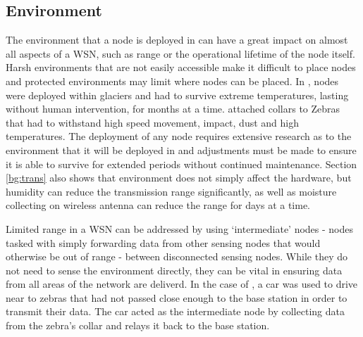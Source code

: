 \subsection{Environment}
	The environment that a node is deployed in can have a great impact on almost all aspects of a WSN, such as range or the operational lifetime of the node itself. Harsh environments that are not easily accessible make it difficult to place nodes and protected environments may limit where nodes can be placed. 
	In \cite{Martinez2004}, nodes were deployed within glaciers and had to survive extreme temperatures, lasting without human intervention, for months at a time. \cite{Martonosi2003} attached collars to Zebras that had to withstand high speed movement, impact, dust and high temperatures. The deployment of any node requires extensive research as to the environment that it will be deployed in and adjustments must be made to ensure it is able to survive for extended periods without continued maintenance.
	Section \ref{bg:trans} also shows that environment does not simply affect the hardware, but humidity can reduce the transmission range significantly, as well as moisture collecting on wireless antenna can reduce the range for days at a time.

	Limited range in a WSN can be addressed by using `intermediate' nodes - nodes tasked with simply forwarding data from other sensing nodes that would otherwise be out of range - between disconnected sensing nodes. While they do not need to sense the environment directly, they can be vital in ensuring data from all areas of the network are deliverd. In the case of \cite{Martonosi2003}, a car was used to drive near to zebras that had not passed close enough to the base station in order to transmit their data. The car acted as the intermediate node by collecting data from the zebra's collar and relays it back to the base station.

